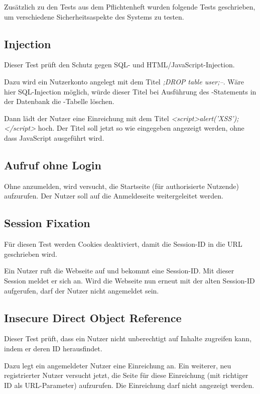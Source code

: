 
Zusätzlich zu den Tests aus dem Pflichtenheft wurden folgende Tests geschrieben,
um verschiedene Sicherheitsaspekte des Systems zu testen.

\subsection{Injection}\label{subsec:injection-test}
Dieser Test prüft den Schutz gegen SQL- und HTML/JavaScript-Injection.

Dazu wird ein Nutzerkonto angelegt mit dem Titel \emph{;DROP table user;--}.
Wäre hier SQL-Injection möglich, würde dieser Titel bei Ausführung des -Statements in der Datenbank
die -Tabelle löschen.

Dann lädt der Nutzer eine Einreichung mit dem Titel \emph{<script>alert('XSS');</script>} hoch.
Der Titel soll jetzt so wie eingegeben angezeigt werden, ohne dass JavaScript ausgeführt wird.

\subsection{Aufruf ohne Login}\label{subsec:unauthorized-test}
Ohne anzumelden, wird versucht, die Startseite (für authorisierte Nutzende) aufzurufen.
Der Nutzer soll auf die Anmeldeseite weitergeleitet werden.

\subsection{Session Fixation}\label{subsec:session-fixation-test}
Für diesen Test werden Cookies deaktiviert, damit die Session-ID in die URL geschrieben wird.

Ein Nutzer ruft die Webseite auf und bekommt eine Session-ID\@.
Mit dieser Session meldet er sich an.
Wird die Webseite nun erneut mit der alten Session-ID aufgerufen, darf der Nutzer nicht angemeldet sein.

\subsection{Insecure Direct Object Reference}\label{subsec:idor-test}
Dieser Test prüft, dass ein Nutzer nicht unberechtigt auf Inhalte zugreifen kann, indem er deren ID herausfindet.

Dazu legt ein angemeldeter Nutzer eine Einreichung an.
Ein weiterer, neu registrierter Nutzer versucht jetzt,
die Seite für diese Einreichung (mit richtiger ID als URL-Parameter) aufzurufen.
Die Einreichung darf nicht angezeigt werden.
